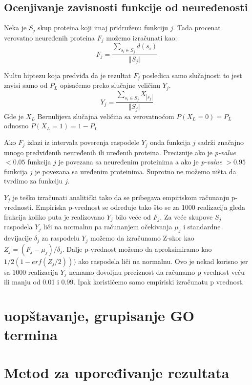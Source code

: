 \subsection{Ocenjivanje zavisnosti funkcije od neuređenosti}

Neka je $S_j$ skup proteina koji imaj pridruženu funkciju $j$. Tada procenat
verovatno neuređenih proteina $F_j$ možemo izračunati kao: $$F_j =
\dfrac{\sum_{s_i \in S_j} d(s_i)} {\Vert S_j \Vert} $$

Nultu hiptezu koja predviđa da je rezultat $F_j$ posledica samo slučajnosti to
jest zavisi samo od $P_L$ opisaćemo preko slučajne veličinu $Y_j$.  $$ Y_j =
\dfrac {\sum_{s_i \in S_j} {X_{|s_j|}}}{\Vert S_j \Vert}$$ Gde je $X_L$
Bernulijeva slučajna veličina sa verovatnoćom $P(X_L = 0) = P_L$ odnosno $P(X_L
= 1) = 1-P_L$

Ako $F_j$ izlazi iz intervala poverenja raspodele $Y_j$ onda funkcija $j$
sadrži značajno mnogo predviđenih neuređenih ili uređenih proteina. Preciznije
ako je \textit{p-value} $<0.05$ funkcija $j$ je povezana sa neuređenim
proteinima a ako je \textit{p-value} $>0.95$ funkcija $j$ je povezana sa
uređenim proteinima. Suprotno ne možemo ništa da tvrdimo za funkciju $j$.

$Y_j$ je teško izračunati analitički tako da se pribegava empiriskom
računanju p-vrednosti. Empiriska p-vrednost se određuje tako što se za 1000
realizacija gleda frakcija koliko puta je realizovano  $Y_j$ bilo veće od
$F_j$.
Za veće skupove $S_j$ raspodela $Y_j$ liči na normalnu pa računanjem očekivanja
$\mu_j$ i standardne devijacije $\delta_j$ za raspodelu $Y_j$ možemo da
izračunamo Z-skor kao $Z_j=(F_j-\mu_j)/\delta_j$. Dalje p-vrednost možemo da
aproksimiramo kao $1/2(1-erf(Z_j/2)))$ ako raspodela liči na normalnu.  Ovo je
nekad korisno jer sa 1000 realizacija $Y_j$ nemamo dovoljnu preciznost da
računamo p-vrednost veću ili manju od 0.01 i 0.99. Ipak koristićemo samo
empiriski izračunatu p vrednost.

\section {uopštavanje, grupisanje  GO termina}

\section {Metod za upoređivanje rezultata}
